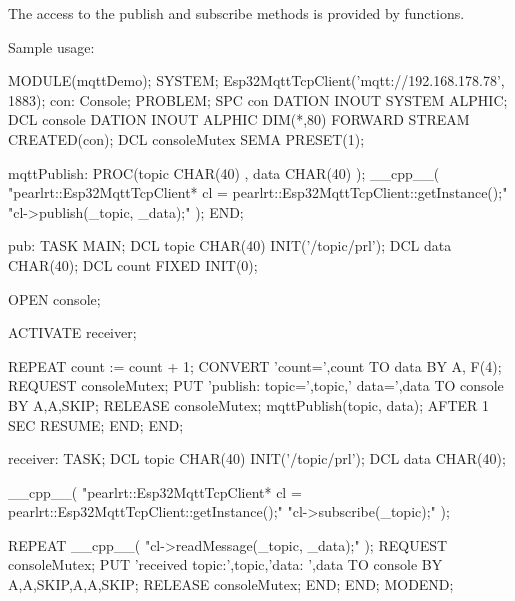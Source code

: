 The access to the publish and subscribe methods is provided by functions.

Sample usage:
\begin{PEARLCode}
MODULE(mqttDemo);
SYSTEM;
   Esp32MqttTcpClient('mqtt://192.168.178.78', 1883);
   con: Console;
PROBLEM;
   SPC con DATION INOUT SYSTEM ALPHIC;
   DCL console DATION INOUT ALPHIC DIM(*,80) FORWARD
       STREAM CREATED(con);
   DCL consoleMutex SEMA PRESET(1);

mqttPublish: PROC(topic CHAR(40) , data CHAR(40) );
   __cpp__(
    "pearlrt::Esp32MqttTcpClient* cl = pearlrt::Esp32MqttTcpClient::getInstance();"
    "cl->publish(_topic, _data);"
);
END;

pub: TASK MAIN;
    DCL topic CHAR(40) INIT('/topic/prl');
    DCL data CHAR(40);
    DCL count FIXED INIT(0);

    OPEN console;

    ACTIVATE receiver;

    REPEAT
       count := count + 1;
       CONVERT 'count=',count TO data BY A, F(4);
       REQUEST consoleMutex;
          PUT 'publish: topic=',topic,' data=',data TO console 
           BY A,A,SKIP;
       RELEASE consoleMutex;
       mqttPublish(topic, data);
       AFTER 1 SEC RESUME;
    END;
END;

receiver: TASK;
   DCL topic CHAR(40) INIT('/topic/prl');
   DCL data CHAR(40);

   __cpp__(
          "pearlrt::Esp32MqttTcpClient* cl = pearlrt::Esp32MqttTcpClient::getInstance();"
         "cl->subscribe(_topic);"
   );

   REPEAT
     __cpp__(
          "cl->readMessage(_topic, _data);"
     );
     REQUEST consoleMutex;
        PUT 'received topic:',topic,'data: ',data TO console 
         BY A,A,SKIP,A,A,SKIP;
     RELEASE consoleMutex;
   END;
END;
MODEND;
\end{PEARLCode}

